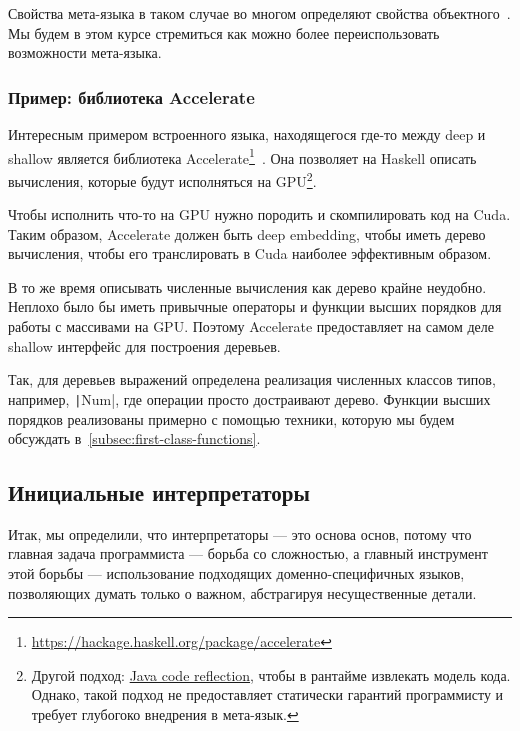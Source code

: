 \documentclass[12pt]{article}
\begin{document}
    Свойства мета-языка в таком случае во многом определяют свойства объектного~\cite{reynolds1972definitional,reynolds1998definitional}.
    Мы будем в этом курсе стремиться как можно более переиспользовать возможности мета-языка.

    \subsubsection{Пример: библиотека Accelerate}

    Интересным примером встроенного языка, находящегося где-то между deep и shallow является библиотека Accelerate\footnote{\url{https://hackage.haskell.org/package/accelerate}}~\cite[chapter 6]{marlow2011parallel}.
    Она позволяет на Haskell описать вычисления, которые будут исполняться на GPU\footnote{Другой подход: \href{https://youtu.be/6c0DB2kwF_Q?si=-nB7AkCsDWB_Q-hy}{Java code reflection}, чтобы в рантайме извлекать модель кода. Однако, такой подход не предоставляет статически гарантий программисту и требует глубогоко внедрения в мета-язык.}.

    Чтобы исполнить что-то на GPU нужно породить и скомпилировать код на Cuda.
    Таким образом, Accelerate должен быть deep embedding, чтобы иметь дерево вычисления, чтобы его транслировать в Cuda наиболее эффективным образом.
    
    В то же время описывать численные вычисления как дерево крайне неудобно.
    Неплохо было бы иметь привычные операторы и функции высших порядков для работы с массивами на GPU\@.
    Поэтому Accelerate предоставляет на самом деле shallow интерфейс для построения деревьев.

    Так, для деревьев выражений определена реализация численных классов типов, например, \texttt|Num|, где операции просто достраивают дерево.
    Функции высших порядков реализованы примерно с помощью техники, которую мы будем обсуждать в~\ref{subsec:first-class-functions}.


    \subsection{Инициальные интерпретаторы}

    Итак, мы определили, что интерпретаторы --- это основа основ, потому что главная задача программиста --- борьба со сложностью, а главный инструмент этой борьбы --- использование подходящих доменно-специфичных языков, позволяющих думать только о важном, абстрагируя несущественные детали.
\end{document}
